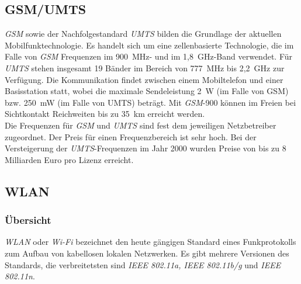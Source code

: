    \subsection{GSM/UMTS}
        \emph{GSM} sowie der Nachfolgestandard \emph{UMTS} bilden die Grundlage der aktuellen Mobilfunktechnologie.
        Es handelt sich um eine zellenbasierte Technologie, die im Falle von \emph{GSM} Frequenzen im
        900~MHz- und im 1,8~GHz-Band verwendet. Für \emph{UMTS} stehen insgesamt 19 Bänder im Bereich von 777~MHz 
        bis 2,2~GHz zur Verfügung. Die Kommunikation findet zwischen einem Mobiltelefon und einer
        Basisstation statt, wobei die maximale Sendeleistung 2~W (im Falle von GSM) bzw. 250~mW (im Falle
        von UMTS) beträgt. Mit \emph{GSM}-900 können im Freien bei Sichtkontakt Reichweiten bis zu 35~km erreicht
        werden. \cite{Mobilfunk}
        \\
        Die Frequenzen für \emph{GSM} und \emph{UMTS} sind fest dem jeweiligen Netzbetreiber zugeordnet. Der Preis
        für einen Frequenzbereich ist sehr hoch. Bei der Versteigerung der \emph{UMTS}-Frequenzen im  
        Jahr 2000 wurden Preise von bis zu 8 Milliarden Euro pro Lizenz erreicht. \cite{umts_versteigerung} 

    \subsection{WLAN}\label{wlan}

        \subsubsection{Übersicht}
            \emph{WLAN} oder \emph{Wi-Fi} bezeichnet den heute gängigen Standard eines Funkprotokolls zum Aufbau
            von kabellosen lokalen Netzwerken. Es gibt mehrere Versionen des Standards, die verbreitetsten
            sind \emph{IEEE 802.11a, IEEE 802.11b/g} und \emph{IEEE 802.11n}. \cite{ieee_wlan}

